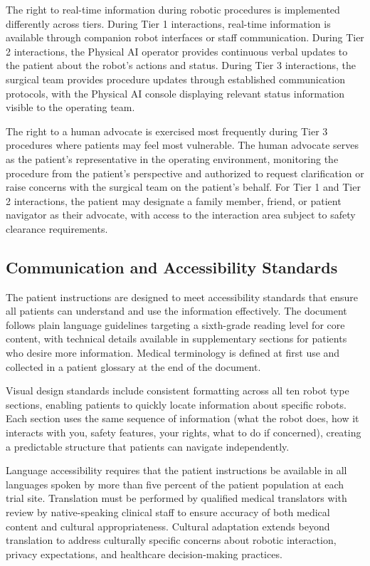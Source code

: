 The right to real-time information during robotic procedures is implemented
differently across tiers. During Tier 1 interactions, real-time information is
available through companion robot interfaces or staff communication. During
Tier 2 interactions, the Physical AI operator provides continuous verbal
updates to the patient about the robot's actions and status. During Tier 3
interactions, the surgical team provides procedure updates through established
communication protocols, with the Physical AI console displaying relevant
status information visible to the operating team.

The right to a human advocate is exercised most frequently during Tier 3
procedures where patients may feel most vulnerable. The human advocate serves
as the patient's representative in the operating environment, monitoring the
procedure from the patient's perspective and authorized to request
clarification or raise concerns with the surgical team on the patient's behalf.
For Tier 1 and Tier 2 interactions, the patient may designate a family member,
friend, or patient navigator as their advocate, with access to the interaction
area subject to safety clearance requirements.

\subsection{Communication and Accessibility Standards}
\label{subsec:instructions-accessibility}

The patient instructions are designed to meet accessibility standards that
ensure all patients can understand and use the information effectively. The
document follows plain language guidelines targeting a sixth-grade reading
level for core content, with technical details available in supplementary
sections for patients who desire more information. Medical terminology is
defined at first use and collected in a patient glossary at the end of the
document.

Visual design standards include consistent formatting across all ten robot type
sections, enabling patients to quickly locate information about specific robots.
Each section uses the same sequence of information (what the robot does, how it
interacts with you, safety features, your rights, what to do if concerned),
creating a predictable structure that patients can navigate independently.

Language accessibility requires that the patient instructions be available in
all languages spoken by more than five percent of the patient population at
each trial site. Translation must be performed by qualified medical translators
with review by native-speaking clinical staff to ensure accuracy of both
medical content and cultural appropriateness. Cultural adaptation extends
beyond translation to address culturally specific concerns about robotic
interaction, privacy expectations, and healthcare decision-making practices.

